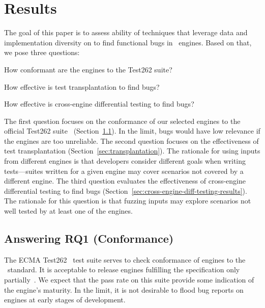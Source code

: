 \documentclass[sigconf,review, anonymous]{acmart}
\begin{document}
\section{Results}
\label{sec:results}

The goal of this paper is to assess ability of techniques that
leverage data and implementation diversity on to find functional bugs
in \javascript\ engines. Based on that, we pose three questions:
\begin{description}[leftmargin=.5in]
\item[RQ1.] How conformant are the engines to the Test262 suite?
\item[RQ2.] How effective is test transplantation to find bugs?
\item[RQ3.] How effective is cross-engine differential testing to find bugs?  
\end{description}

The first question focuses on the conformance of our selected engines
to the official Test262 suite~\cite{ecma262-conformance-suite}
(Section~\ref{sec:stability}). In the limit, bugs would have low
relevance if the engines are too unreliable. The second question
focuses on the effectiveness of test transplantation
(Section~\ref{sec:transplantation}). The rationale for using inputs
from different engines is that developers consider different goals
when writing tests---suites written for a given engine may cover
scenarios not covered by a different engine. The third question
evaluates the effectiveness of cross-engine differential testing to
find bugs (Section~\ref{sec:cross-engine-diff-testing-results}). The
rationale for this question is that fuzzing inputs may explore
scenarios not well tested by at least one of the engines.

\subsection{Answering RQ1 (Conformance)}
\label{sec:stability}

The ECMA Test262~\cite{ecma262-conformance-suite} test suite serves to
check conformance of engines to the \js\ standard. It is
acceptable to release engines fulfilling the specification only
partially~\cite{kangax}. We expect that the pass rate on this suite
provide some indication of the engine's maturity. In the limit, it is
not desirable to flood bug reports on engines at early stages of
development. 
\end{document}
